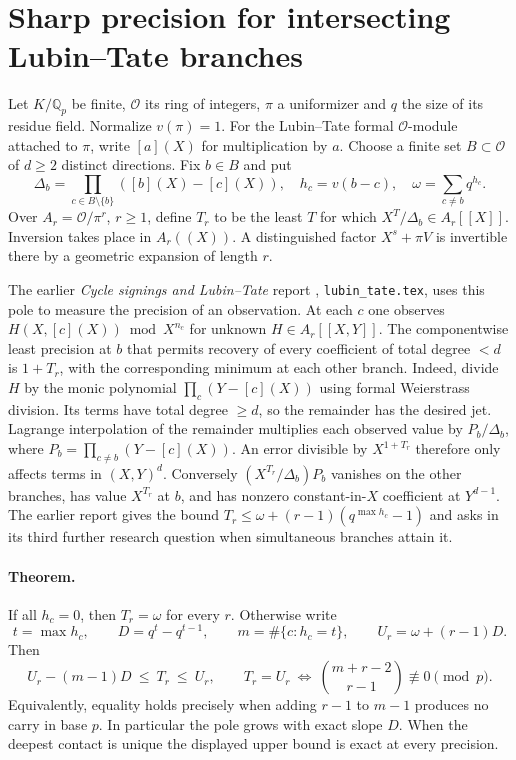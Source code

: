 \section{Sharp precision for intersecting Lubin--Tate branches}
Let $K/\mathbb Q_p$ be finite, $\mathcal O$ its ring of integers, $\pi$ a uniformizer and $q$ the size of its residue field. Normalize $v(\pi)=1$. For the Lubin--Tate formal $\mathcal O$-module attached to $\pi$, write $[a](X)$ for multiplication by $a$. Choose a finite set $B\subset\mathcal O$ of $d\ge2$ distinct directions. Fix $b\in B$ and put
\[
 \Delta_b=\prod_{c\in B\setminus\{b\}}([b](X)-[c](X)),\quad
 h_c=v(b-c),\quad \omega=\sum_{c\ne b}q^{h_c}.
\]
Over $A_r=\mathcal O/\pi^r$, $r\ge1$, define $T_r$ to be the least $T$ for which $X^T/\Delta_b\in A_r[[X]]$. Inversion takes place in $A_r((X))$. A distinguished factor $X^s+\pi V$ is invertible there by a geometric expansion of length $r$.

The earlier \emph{Cycle signings and Lubin--Tate} report \cite{priorlt}, \texttt{lubin\_tate.tex}, uses this pole to measure the precision of an observation. At each $c$ one observes $H(X,[c](X))\bmod X^{n_c}$ for unknown $H\in A_r[[X,Y]]$. The componentwise least precision at $b$ that permits recovery of every coefficient of total degree $<d$ is $1+T_r$, with the corresponding minimum at each other branch. Indeed, divide $H$ by the monic polynomial $\prod_c(Y-[c](X))$ using formal Weierstrass division. Its terms have total degree $\ge d$, so the remainder has the desired jet. Lagrange interpolation of the remainder multiplies each observed value by $P_b/\Delta_b$, where $P_b=\prod_{c\ne b}(Y-[c](X))$. An error divisible by $X^{1+T_r}$ therefore only affects terms in $(X,Y)^d$. Conversely $(X^{T_r}/\Delta_b)P_b$ vanishes on the other branches, has value $X^{T_r}$ at $b$, and has nonzero constant-in-$X$ coefficient at $Y^{d-1}$. The earlier report gives the bound $T_r\le\omega+(r-1)(q^{\max h_c}-1)$ and asks in its third further research question when simultaneous branches attain it.

\paragraph{Theorem.}
If all $h_c=0$, then $T_r=\omega$ for every $r$. Otherwise write
\[
 t=\max h_c,\qquad D=q^t-q^{t-1},\qquad m=\#\{c:h_c=t\},\qquad U_r=\omega+(r-1)D .
\]
Then
\[
 U_r-(m-1)D\ \le\ T_r\ \le\ U_r,\qquad
 T_r=U_r\ \Longleftrightarrow\
 \binom{m+r-2}{r-1}\not\equiv0\pmod p .
\]
Equivalently, equality holds precisely when adding $r-1$ to $m-1$ produces no carry in base $p$. In particular the pole grows with exact slope $D$. When the deepest contact is unique the displayed upper bound is exact at every precision.

